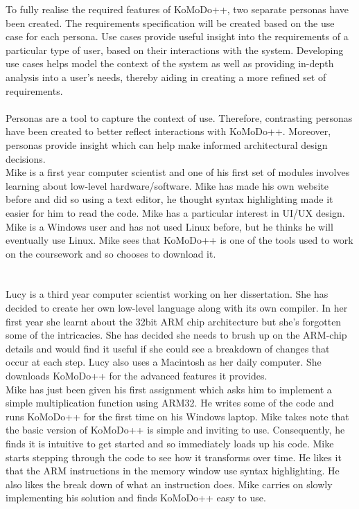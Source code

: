 To fully realise the required features of KoMoDo++, two separate personas have been created. The requirements specification will be created based on the use case for each persona. Use cases provide useful insight into the requirements of a particular type of user, based on their interactions with the system. Developing use cases helps model the context of the system as well as providing in-depth analysis into a user's needs, thereby aiding in creating a more refined set of requirements.\\\\
%
Personas are a tool to capture the context of use. Therefore, contrasting personas have been created to better reflect interactions with KoMoDo++. Moreover, personas provide insight which can help make informed architectural design decisions.
%
\\
Mike is a first year computer scientist and one of his first set of modules involves learning about low-level hardware/software. Mike has made his own website before and did so using a text editor, he thought syntax highlighting made it easier for him to read the code. Mike has a particular interest in UI/UX design. Mike is a Windows user and has not used Linux before, but he thinks he will eventually use Linux. Mike sees that KoMoDo++ is one of the tools used to work on the coursework and so chooses to download it.\\\\
%
\\
Lucy is a third year computer scientist working on her dissertation. She has decided to create her own low-level language along with its own compiler. In her first year she learnt about the 32bit ARM chip architecture but she's forgotten some of the intricacies. She has decided she needs to brush up on the ARM-chip details and would find it useful if she could see a breakdown of changes that occur at each step. Lucy also uses a Macintosh as her daily computer. She downloads KoMoDo++ for the advanced features it provides.
%
\\
Mike has just been given his first assignment which asks him to implement a simple multiplication function using ARM32. He writes some of the code and runs KoMoDo++ for the first time on his Windows laptop. Mike takes note that the basic version of KoMoDo++ is simple and inviting to use. Consequently, he finds it is intuitive to get started and so immediately loads up his code. Mike starts stepping through the code to see how it transforms over time. He likes it that the ARM instructions in the memory window use syntax highlighting. He also likes the break down of what an instruction does.  Mike carries on slowly implementing his solution and finds KoMoDo++ easy to use.\\\\
